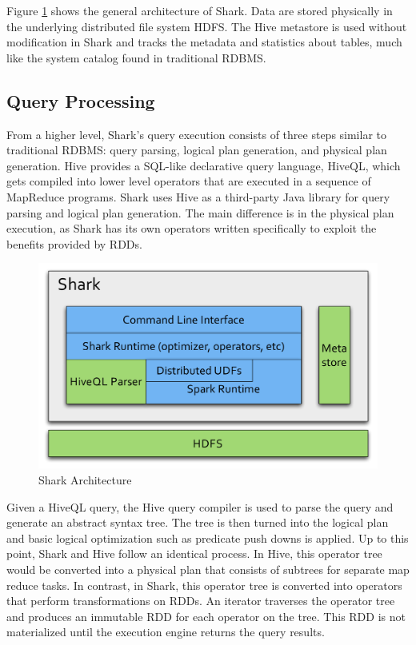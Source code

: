 \documentclass[preprint]{acm_proc_article-sp}
\begin{document}
Figure \ref{fig:arch} shows the general architecture of Shark. Data are stored physically in the underlying distributed file system HDFS. The Hive metastore is used without modification in Shark and tracks the metadata and statistics about tables, much like the system catalog found in traditional RDBMS. 

\subsection{Query Processing}
From a higher level, Shark's query execution consists of three steps similar to traditional RDBMS: query parsing, logical plan generation, and physical plan generation. Hive provides a SQL-like declarative query language, HiveQL, which gets compiled into lower level operators that are executed in a sequence of MapReduce programs. Shark uses Hive as a third-party Java library for query parsing and logical plan generation. The main difference is in the physical plan execution, as Shark has its own operators written specifically to exploit the benefits provided by RDDs.

\begin{figure}[t]
	\centering
	\includegraphics[width=\linewidth]{files/architecture.pdf}
	\caption{Shark Architecture}
	\label{fig:arch}
\end{figure}

Given a HiveQL query, the Hive query compiler is used to parse the query and generate an abstract syntax tree. The tree is then turned into the logical plan and basic logical optimization such as predicate push downs is applied. Up to this point, Shark and Hive follow an identical process. In Hive, this operator tree would be converted into a physical plan that consists of subtrees for separate map reduce tasks. In contrast, in Shark, this operator tree is converted into operators that perform transformations on RDDs. An iterator traverses the operator tree and produces an immutable RDD for each operator on the tree. This RDD is not materialized until the execution engine returns the query results. 
\end{document}
